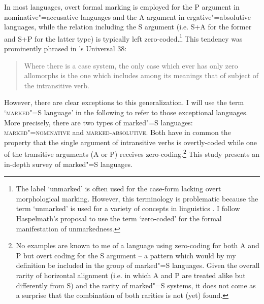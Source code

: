 In most languages, overt formal marking is employed for the P argument in nominative"=accusative languages and the A argument in ergative"=absolutive languages, while the relation including the S argument (i.e. S+A for the former and S+P for the latter type) is typically left zero-coded.\footnote{The label `unmarked' is often used for the case-form lacking overt morphological marking. 
However, this terminology is problematic because the term `unmarked' is used for a variety of concepts in linguistics \citep{Haspelmath.mark:2006}. 
I follow Haspelmath's proposal to use the term `zero-coded' for the formal manifestation of unmarkedness.}  
This tendency was prominently phrased in \citeauthor{Greenberg:1963}'s Universal 38:

\begin{quote} Where there is a case system, the only case which ever has only zero allomorphs is the one which includes among its meanings that of subject of the intransitive verb.
\citep[75]{Greenberg:1963}
\end{quote}  

However, there are clear exceptions to this generalization. 
I will use the term `\textsc{marked"=S} language' in the following to refer to those exceptional languages. 
More precisely, there are two types of marked"=S languages: \textsc{marked"=nominative} and \textsc{marked-absolutive}. 
Both have in common the property that the single argument of intransitive verbs is overtly-coded while one of the transitive arguments (A or P) receives zero-coding.\footnote{No examples are known to me of a language using zero-coding for both A and P but overt coding for the S argument -- a pattern which would by my definition be included in the group of marked"=S languages. 
Given the overall rarity of horizontal alignment (i.e. in which A and P are treated alike but differently from S) and the rarity of marked"=S systems, it does not come as a surprise that the combination of both rarities is not (yet) found.} 
This study presents an in-depth survey of marked"=S languages.

